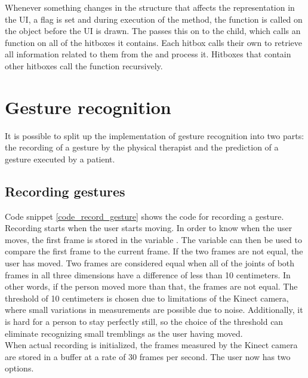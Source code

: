 Whenever something changes in the  structure that affects the representation in the UI, a flag is set and during execution of the   method, the  function is called on the  object before the UI is drawn. The  passes this on to the  child, which calls an  function on all of the hitboxes it contains. Each hitbox calls their own  to retrieve all information related to them from the  and process it. Hitboxes that contain other hitboxes call the  function recursively.


\section{Gesture recognition}

It is possible to split up the implementation of gesture recognition into two parts: the recording of a gesture by the physical therapist and the prediction of a gesture executed by a patient.


\subsection{Recording gestures}

Code snippet \ref{code_record_gesture} shows the code for recording a gesture. Recording starts when the user starts moving. In order to know when the user moves, the first frame is stored in the variable . The variable can then be used to compare the first frame to the current frame. If the two frames are not equal, the user has moved. Two frames are considered equal when all of the joints of both frames in all three dimensions have a difference of less than 10 centimeters. In other words, if the person moved more than that, the frames are not equal. The threshold of 10 centimeters is chosen due to limitations of the Kinect camera, where small variations in measurements are possible due to noise. Additionally, it is hard for a person to stay perfectly still, so the choice of the threshold can eliminate recognizing small tremblings as the user having moved.\\

When actual recording is initialized, the frames measured by the Kinect camera are stored in a buffer at a rate of 30 frames per second. The user now has two options.\\


